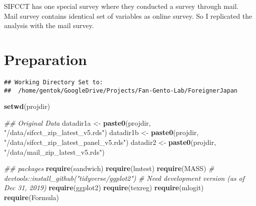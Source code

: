 \documentclass[
]{article}
\newenvironment{Shaded}{\begin{snugshade}}{\end{snugshade}}
\newcommand{\CharTok}[1]{\textcolor[rgb]{0.31,0.60,0.02}{#1}}
\newcommand{\CommentTok}[1]{\textcolor[rgb]{0.56,0.35,0.01}{\textit{#1}}}
\newcommand{\ControlFlowTok}[1]{\textcolor[rgb]{0.13,0.29,0.53}{\textbf{#1}}}
\newcommand{\DataTypeTok}[1]{\textcolor[rgb]{0.13,0.29,0.53}{#1}}
\newcommand{\KeywordTok}[1]{\textcolor[rgb]{0.13,0.29,0.53}{\textbf{#1}}}
\newcommand{\NormalTok}[1]{#1}
\newcommand{\OperatorTok}[1]{\textcolor[rgb]{0.81,0.36,0.00}{\textbf{#1}}}
\newcommand{\OtherTok}[1]{\textcolor[rgb]{0.56,0.35,0.01}{#1}}
\newcommand{\StringTok}[1]{\textcolor[rgb]{0.31,0.60,0.02}{#1}}
\begin{document}
SIFCCT has one special survey where they conducted a survey through
mail. Mail survey contains identical set of variables as online survey.
So I replicated the analysis with the mail survey.

\hypertarget{preparation}{%
\section{Preparation}\label{preparation}}

\begin{Shaded}
\end{Shaded}

\begin{verbatim}
## Working Directory Set to:
##  /home/gentok/GoogleDrive/Projects/Fan-Gento-Lab/ForeignerJapan
\end{verbatim}

\begin{Shaded}
\begin{Highlighting}[]
\KeywordTok{setwd}\NormalTok{(projdir)}

\CommentTok{## Original Data}
\NormalTok{datadir1a <-}\StringTok{ }\KeywordTok{paste0}\NormalTok{(projdir, }\StringTok{"/data/sifcct_zip_latest_v5.rds"}\NormalTok{)}
\NormalTok{datadir1b <-}\StringTok{ }\KeywordTok{paste0}\NormalTok{(projdir, }\StringTok{"/data/sifcct_zip_latest_panel_v5.rds"}\NormalTok{)}
\NormalTok{datadir2 <-}\StringTok{ }\KeywordTok{paste0}\NormalTok{(projdir, }\StringTok{"/data/mail_zip_latest_v5.rds"}\NormalTok{)}

\CommentTok{## packages}
\KeywordTok{require}\NormalTok{(sandwich)}
\KeywordTok{require}\NormalTok{(lmtest)}
\KeywordTok{require}\NormalTok{(MASS)}
\CommentTok{# devtools::install_github("tidyverse/ggplot2") # Need development version (as of Dec 31, 2019)}
\KeywordTok{require}\NormalTok{(ggplot2)}
\KeywordTok{require}\NormalTok{(texreg)}
\KeywordTok{require}\NormalTok{(mlogit)}
\KeywordTok{require}\NormalTok{(Formula)}
\end{Highlighting}
\end{Shaded}
\end{document}
